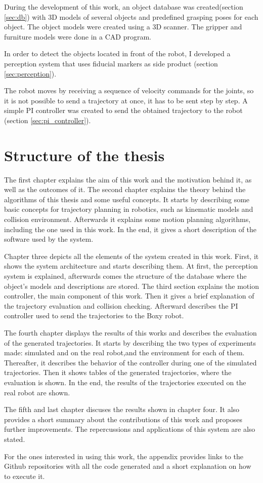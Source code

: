 During the development of this work, an object database was created(section \ref{sec:db}) with 3D models of several objects and predefined grasping poses for each object. The object models were created using a 3D scanner. The gripper and furniture models were done in a CAD program.

In order to detect the objects located in front of the robot, I developed a perception system that uses fiducial markers as side product (section \ref{sec:perception}).

The robot moves by receiving a sequence of velocity commands for the joints, so it is not possible to send a trajectory at once, it has to be sent step by step. A simple PI controller was created to send the obtained trajectory to the robot (section \ref{sec:pi_controller}).


\section{Structure of the thesis}

The first chapter explains the aim of this work and the motivation behind it, as well as the outcomes of it. The second chapter explains the theory behind the algorithms of this thesis and some useful concepts. It starts by describing some basic concepts for trajectory planning in robotics, such as kinematic models and collision environment. Afterwards it explains some motion planning algorithms, including the one used in this work. In the end, it gives a short description of the  software used by the system.

Chapter three depicts all the elements of the system created in this work. First, it shows the system architecture and starts describing them. At first, the perception system is explained, afterwards comes the structure of the database where the object's models and descriptions are stored. The third section explains the motion controller, the main component of this work. Then it gives a brief explanation of the trajectory evaluation and collision checking. Afterward describes the PI controller used to send the trajectories to the Boxy robot.

The fourth chapter displays the results of this works and describes the evaluation of the generated trajectories. It starts by describing the two types of experiments made: simulated and on the real robot,and the environment for each of them. Thereafter, it describes the behavior of the controller during one of the simulated trajectories. Then it shows tables of the generated trajectories, where the evaluation is shown. In the end, the results of the trajectories executed on the real robot are shown.

The fifth and last chapter discuses the results shown in chapter four. It also provides a short summary about the contributions of this work and proposes further improvements. The repercussions and applications of this system are also stated.

For the ones interested in using this work, the appendix provides links to the Github repositories with all the code generated and a short explanation on how to execute it.
